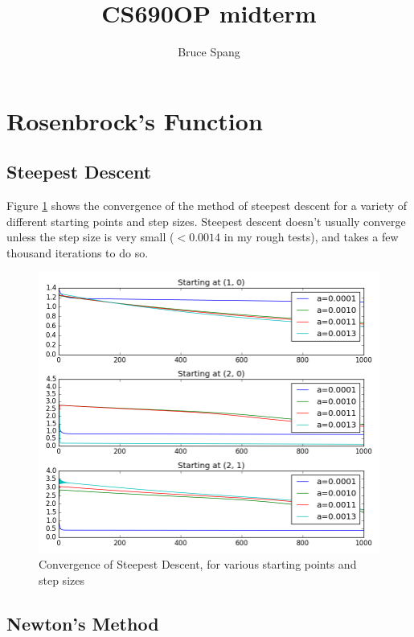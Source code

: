 \documentclass{article}
\begin{document}
\title{CS690OP midterm}
\author{Bruce Spang}
\maketitle

\section{Rosenbrock's Function}

\subsection{Steepest Descent}

Figure \ref{fig:rosenbrock-linear} shows the convergence of the method of steepest descent for a variety of different starting points and step sizes. Steepest descent doesn't usually converge unless the step size is very small ($< 0.0014$ in my rough tests), and takes a few thousand iterations to do so.

\begin{figure}[!ht]
  \centering
  \includegraphics[width=\textwidth,keepaspectratio=true]{rosenbrock-linear.png}
  \caption{Convergence of Steepest Descent, for various starting points and step sizes}
  \label{fig:rosenbrock-linear}
\end{figure}

\subsection{Newton's Method}
\end{document}
